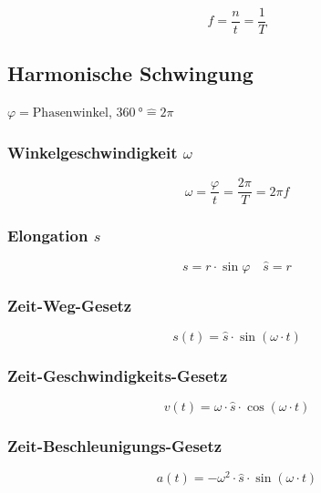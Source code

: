 
\begin{equation}\label{eq:schwingung:frequenz}
f = \frac{n}{t} = \frac{1}{T}
\end{equation}

\subsection{Harmonische Schwingung}
$\varphi = \text{Phasenwinkel}$, $\SI{360}{\degree} \hat{=} 2\pi $

\subsubsection{Winkelgeschwindigkeit $\omega$}
\begin{equation}\label{eq:schwingung:winkelgeschwindigkeit}
\omega = \frac{\varphi}{t} = \frac{2 \pi}{T} = 2 \pi f
\end{equation}

\subsubsection{Elongation $s$}
\begin{equation}\label{eq:schwingung:elongation}
s = r \cdot \sin \varphi \quad \hat{s} = r
\end{equation}

\subsubsection{Zeit-Weg-Gesetz}
\begin{equation}\label{eq:schwingung:t:s:gesetz}
s(t) = \hat{s}\cdot\sin(\omega\cdot t)
\end{equation}

\subsubsection{Zeit-Geschwindigkeits-Gesetz}
\begin{equation}\label{eq:schwingung:t:v:gesetz}
v(t) = \omega \cdot \hat{s} \cdot \cos(\omega \cdot t)
\end{equation}

\subsubsection{Zeit-Beschleunigungs-Gesetz}
\begin{equation}\label{eq:schwingung:t:a:gesetz}
a(t) = - \omega^2 \cdot \hat{s} \cdot \sin(\omega \cdot t)
\end{equation}

